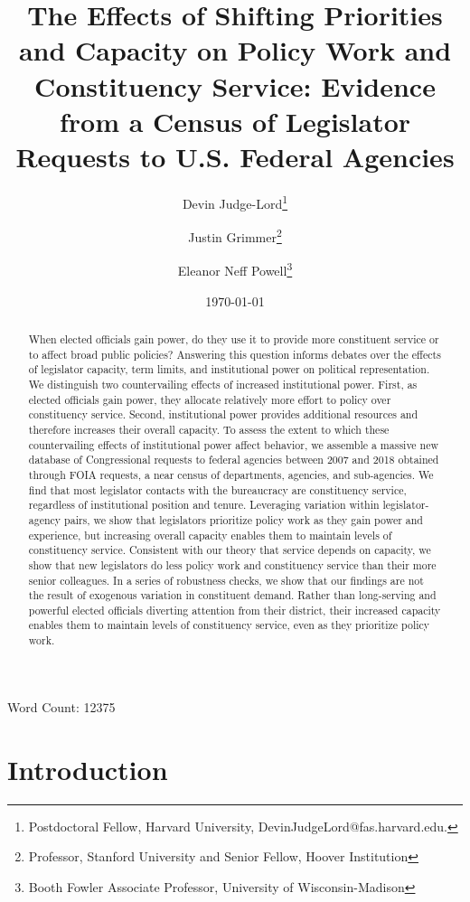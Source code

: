 \documentclass[12pt]{article}
\title{The Effects of Shifting Priorities and Capacity on Policy Work and Constituency Service: Evidence from a Census of Legislator Requests to U.S. Federal Agencies}
\author{Devin Judge-Lord\thanks{Postdoctoral Fellow, Harvard University, DevinJudgeLord@fas.harvard.edu.}\and Justin Grimmer\thanks{Professor, Stanford University and Senior Fellow, Hoover Institution} \and Eleanor Neff Powell\thanks{Booth Fowler Associate Professor, University of Wisconsin-Madison}}
\date{\today}
\begin{document}
\maketitle

\begin{abstract}

\noindent When elected officials gain power, do they use it to provide more constituent service or to affect broad public policies? Answering this question informs debates over the effects of legislator capacity, term limits, and institutional power on political representation. We distinguish two countervailing effects of increased institutional power. First, as elected officials gain power, they allocate relatively more effort to policy over constituency service. Second, institutional power provides additional resources and therefore increases their overall capacity. To assess the extent to which these countervailing effects of institutional power affect behavior, we assemble a massive new database of   Congressional requests to federal agencies between 2007 and 2018 obtained through  FOIA requests, a near census of departments, agencies, and sub-agencies. We find that most legislator contacts with the bureaucracy are constituency service, regardless of institutional position and tenure. Leveraging variation within legislator-agency pairs, we show that legislators prioritize policy work as they gain power and experience, but increasing overall capacity enables them to maintain levels of constituency service. Consistent with our theory that service depends on capacity, we show that new legislators do less policy work and constituency service than their more senior colleagues. In a series of robustness checks, we show that our findings are not the result of exogenous variation in constituent demand. Rather than long-serving and powerful elected officials diverting attention from their district, their increased capacity enables them to maintain levels of constituency service, even as they prioritize policy work.
\end{abstract}

Word Count: 12375

\newpage


\doublespacing

\section{Introduction}
\end{document}

